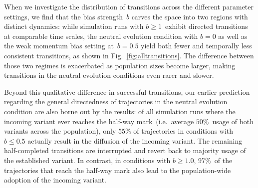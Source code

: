 \documentclass[10pt]{article}
\begin{document}
When we investigate the distribution of transitions across the different parameter settings, we find that the bias strength~$b$ carves the space into two regions with distinct dynamics: while simulation runs with $b\ge1$~exhibit directed transitions at comparable time scales, the neutral evolution condition with $b=0$ as well as the weak momentum bias setting at~$b=0.5$ yield both fewer and temporally less consistent transitions, as shown in Fig.~\ref{fig:alltransitions}. The difference between those two regimes is exacerbated as population sizes become larger, making transitions in the neutral evolution conditions even rarer and slower.

Beyond this qualitative difference in successful transitions, our earlier prediction regarding the general directedness of trajectories in the neutral evolution condition are also borne out by the results: of all simulation runs where the incoming variant ever reaches the half-way mark~(i.e.~average $50\%$~usage of both variants across the population), only $55\%$ of trajectories in conditions with $b\le0.5$ actually result in the diffusion of the incoming variant. The remaining half-completed transitions are interrupted and revert back to majority usage of the established variant. In contrast, in conditions with $b\ge1.0$, $97\%$~of the trajectories that reach the half-way mark also lead to the population-wide adoption of the incoming variant.
\end{document}
